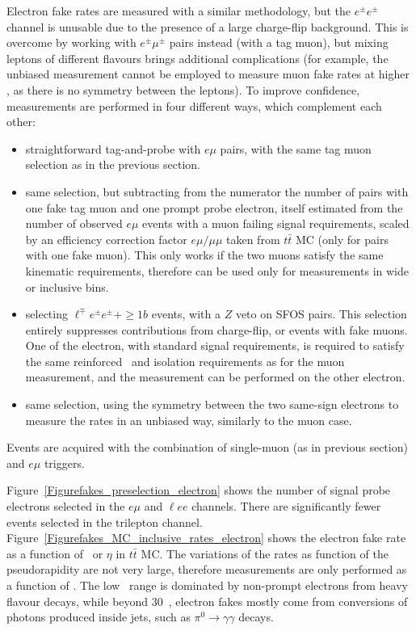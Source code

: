 Electron fake rates are measured with a similar methodology, but the $e^\pm e^\pm$ channel is unusable due to the presence of a large charge-flip background. 
This is overcome by working with $e^\pm\mu^\pm$ pairs instead (with a tag muon), but mixing leptons of different flavours brings additional complications 
(for example, the unbiased measurement cannot be employed to measure muon fake rates at higher \pt, as there is no symmetry between the leptons). 
To improve confidence, measurements are performed in four different ways, which complement each other: 
\begin{itemize}
\item straightforward tag-and-probe with $e\mu$ pairs, with the same tag muon selection as in the previous section. 
\item same selection, but subtracting from the numerator the number of pairs with one fake tag muon and one prompt probe electron, 
itself estimated from the number of observed $e\mu$ events with a muon failing signal requirements, 
scaled by an efficiency correction factor $e\mu/\mu\mu$ taken from $t\bar t$ MC (only for pairs with one fake muon). 
This only works if the two muons satisfy the same kinematic requirements, therefore can be used only for measurements in wide or inclusive bins. 
\item selecting $\ell^\mp e^\pm e^\pm+\ge 1b$ events, with a $Z$ veto on SFOS pairs. 
This selection entirely suppresses contributions from charge-flip, or events with fake muons. 
One of the electron, with standard signal requirements, is required to satisfy the same reinforced \pt\ and isolation requirements as for the muon measurement,
and the measurement can be performed on the other electron. 
\item same selection, using the symmetry between the two same-sign electrons to measure the rates in an unbiased way, similarly to the muon case. 
\end{itemize}
Events are acquired with the combination of single-muon (as in previous section) and $e\mu$ triggers. 


Figure~\ref{Figurefakes_preselection_electron} shows the number of signal probe electrons selected in the $e\mu$ and $\ell ee$ channels. 
There are significantly fewer events selected in the trilepton channel. 
Figure~\ref{Figurefakes_MC_inclusive_rates_electron} shows the electron fake rate as a function of \pt\ or $\eta$ in $t\bar t$ MC. 
The variations of the rates as function of the pseudorapidity are not very large, 
therefore measurements are only performed as a function of \pt. 
The low \pt\ range is dominated by non-prompt electrons from heavy flavour decays, while beyond 30~\GeV, 
electron fakes mostly come from conversions of photons produced inside jets, such as $\pi^0\to\gamma\gamma$ decays. 

